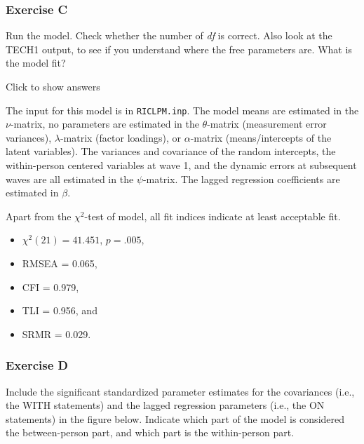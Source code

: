 \documentclass[
]{book}
\providecommand{\tightlist}{%
  \setlength{\itemsep}{0pt}\setlength{\parskip}{0pt}}
\begin{document}
\hypertarget{exercise-c-1}{%
\subsubsection*{Exercise C}\label{exercise-c-1}}

Run the model. Check whether the number of \emph{df} is correct. Also look at the TECH1 output, to see if you understand where the free parameters are. What is the model fit?

Click to show answers

The input for this model is in \texttt{RICLPM.inp}. The model means are estimated in the \(\nu\)-matrix, no parameters are estimated in the \(\theta\)-matrix (measurement error variances), \(\lambda\)-matrix (factor loadings), or \(\alpha\)-matrix (means/intercepts of the latent variables). The variances and covariance of the random intercepts, the within-person centered variables at wave 1, and the dynamic errors at subsequent waves are all estimated in the \(\psi\)-matrix. The lagged regression coefficients are estimated in \(\beta\).

Apart from the \(\chi^{2}\)-test of model, all fit indices indicate at least acceptable fit.

\begin{itemize}
\tightlist
\item
  \(\chi^{2} (21) = 41.451\), \(p = .005\),
\item
  RMSEA = 0.065,
\item
  CFI = 0.979,
\item
  TLI = 0.956, and
\item
  SRMR = 0.029.
\end{itemize}

\hypertarget{exercise-d-1}{%
\subsubsection*{Exercise D}\label{exercise-d-1}}

Include the significant standardized parameter estimates for the covariances (i.e., the WITH statements) and the lagged regression parameters (i.e., the ON statements) in the figure below. Indicate which part of the model is considered the between-person part, and which part is the within-person part.
\end{document}
